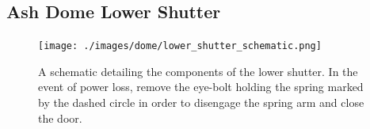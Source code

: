 \documentclass[12pt,titlepage]{article}
\begin{document}
\begin{appendix}
\section{Ash Dome Lower Shutter}

\begin{figure}[H] 
	\begin{center}
		\texttt{[image: ./images/dome/lower\_shutter\_schematic.png]} 
		\label{azimuth_motor}
	\end{center}
	\caption{A schematic detailing the components of the lower shutter.
			In the event of power loss, remove the eye-bolt holding the spring marked by
			the dashed circle in order to disengage the spring arm and close the door.}
	\label{apdx:lower_shutter}
\end{figure}


\end{appendix}


\newpage
\nocite{*}
{}	

\clearpage
\end{document}
